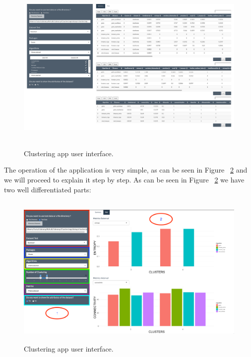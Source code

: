 \begin{figure}[htbp]
  \centering
   \includegraphics[width=14cm, height=8.5cm]{img/app}
    \caption{Clustering app user interface.}
    \label{fig:layoutApp}%
\end{figure}
The operation of the application is very simple, as can be seen in Figure ~\ref{fig:layoutApp1} and we will proceed to explain it step by step.
As can be seen in Figure ~\ref{fig:layoutApp1} we have two well differentiated parts:
\clearpage
\begin{figure}[htbp]
  \centering
   \includegraphics[width=14cm, height=7.5cm]{img/app1}
    \caption{Clustering app user interface.}
    \label{fig:layoutApp1}%
\end{figure}

